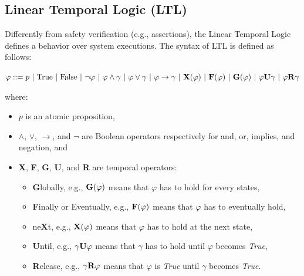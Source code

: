 \documentclass{article}
\theoremstyle{definition}
\begin{document}
\subsection{Linear Temporal Logic (LTL)}
\label{sec:ltl}

Differently from safety verification (e.g., assertions), the Linear
Temporal Logic defines a behavior over system executions.  The syntax
of LTL is defined as follows:

$\varphi ::= p\ |\ \text{True}\ |\ \text{False}\ |\ \neg
\varphi\ |\ \varphi \wedge \gamma\ |\ \varphi \vee \gamma\ |\ \varphi
\rightarrow
\gamma\ |\ \text{\textbf{X}}(\varphi)\ |\ \text{\textbf{F}}(\varphi)\ |\ \text{\textbf{G}}(\varphi)\ |\ \varphi
\text{\textbf{U}} \gamma\ |\ \varphi \text{\textbf{R}} \gamma$

where:
\begin{itemize}
\item $p$ is an atomic proposition,
\item $\wedge$, $\vee$, $\rightarrow$, and $\neg$ are Boolean
  operators respectively for and, or, implies, and negation, and
\item \textbf{X}, \textbf{F}, \textbf{G}, \textbf{U}, and \textbf{R}
  are temporal operators:
\begin{itemize}
\item \textbf{G}lobally, e.g., $\text{\textbf{G}}(\varphi)$ means that
  $\varphi$ has to hold for every states,
\item \textbf{F}inally or Eventually, e.g.,
  $\text{\textbf{F}}(\varphi)$ means that $\varphi$ has to eventually
  hold,
\item ne\textbf{X}t, e.g., $\text{\textbf{X}}(\varphi)$ means that
  $\varphi$ has to hold at the next state,
\item \textbf{U}ntil, e.g., $\gamma \text{\textbf{U}} \varphi$ means
  that $\gamma$ has to hold until $\varphi$ becomes \emph{True},
\item \textbf{R}elease, e.g., $\gamma \text{\textbf{R}} \varphi$ means
  that $\varphi$ is \emph{True} until $\gamma$ becomes \emph{True}.
\end{itemize}
  
\end{itemize}
\end{document}
